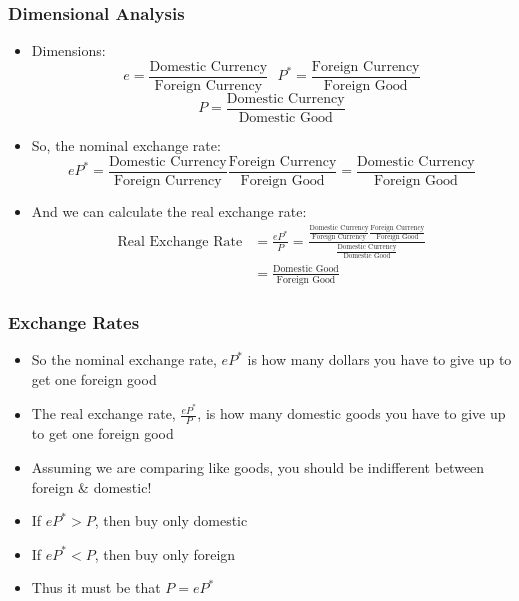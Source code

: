 \documentclass{beamer}
\begin{document}
\begin{frame}
\frametitle[alignment=center]{Dimensional Analysis}
\begin{itemize}
\item Dimensions:
$$e=\frac{\text{Domestic Currency}}{\text{Foreign Currency}}\ \ \ P^*=\frac{\text{Foreign Currency}}{\text{Foreign Good}}$$
$$P=\frac{\text{Domestic Currency}}{\text{Domestic Good}}$$
\item So, the nominal exchange rate:
$$eP^*=\frac{\text{Domestic Currency}}{\text{Foreign Currency}}\frac{\text{Foreign Currency}}{\text{Foreign Good}}=\frac{\text{Domestic Currency}}{\text{Foreign Good}}$$
\item And we can calculate the real exchange rate:
\begin{align*}
\text{Real Exchange Rate} & =\frac{eP^*}{P}=\frac{\frac{\text{Domestic Currency}}{\text{Foreign Currency}}\frac{\text{Foreign Currency}}{\text{Foreign Good}}}{\frac{\text{Domestic Currency}}{\text{Domestic Good}}}\\
 & = \frac{\text{Domestic Good}}{\text{Foreign Good}}
\end{align*}
\end{itemize}
\end{frame}

\begin{frame}
\frametitle[alignment=center]{Exchange Rates}
\begin{itemize}
\item So the nominal exchange rate, $eP^*$ is how many dollars you have to give up to get one foreign good
\bigskip
\item The real exchange rate, $\frac{eP^*}{P}$, is how many domestic goods you have to give up to get one foreign good
\bigskip
\item Assuming we are comparing like goods, you should be indifferent between foreign \& domestic! 
\bigskip 
\item If $eP^*>P$, then buy only domestic
\bigskip
\item If $eP^*<P$, then buy only foreign
\bigskip
\item Thus it must be that $P=eP^*$
\end{itemize}
\end{frame}
\end{document}
